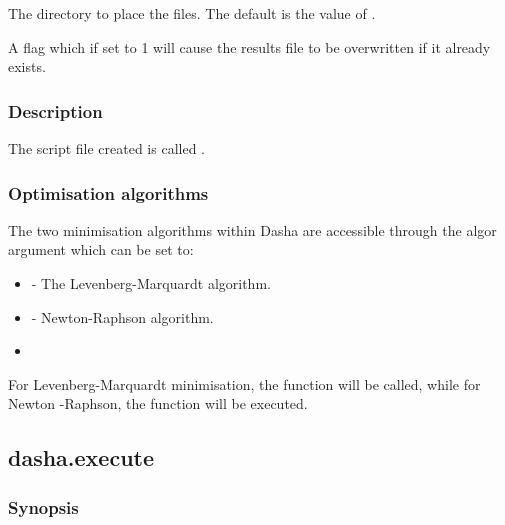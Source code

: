    The directory to place the files.  The default is the value of .   

   A flag which if set to 1 will cause the results file to be overwritten if it already exists.  

  

  
 \subsubsection{Description} 

 The script file created is called . 
  

  
 \subsubsection{Optimisation algorithms} 

 The two minimisation algorithms within Dasha are accessible through the algor argument which can be set to: 
  

 \begin{itemize} 
 \item[]  - The Levenberg-Marquardt algorithm.  
 \item[]  - Newton-Raphson algorithm.  
 \item[]  
 \end{itemize} 
  

 For Levenberg-Marquardt minimisation, the function  will be called, while for Newton -Raphson, the function  will be executed. 
  

  

 \newpage 

 \subsection{dasha.execute} 

  
 \subsubsection{Synopsis} 

